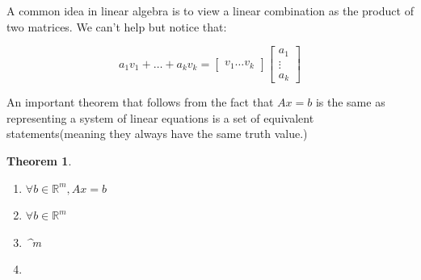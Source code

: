 \documentclass{article}
\newtheorem{thm}{Theorem}
\begin{document}
A common idea in linear algebra is to view a linear combination as the product of two matrices. We can't help but notice that:

\begin{equation*}
    a_{1}v_{1} + \ldots + a_{k}v_{k} = \begin{bmatrix}
        v_{1}  \ldots v_{k}
    \end{bmatrix} \begin{bmatrix}
        a_{1} \\
        \vdots \\
        a_{k}
    \end{bmatrix}
\end{equation*}

An important theorem that follows from the fact that $Ax=b$ is the same as representing a system of linear equations is a set of equivalent statements(meaning they always have the same truth value.) 

\begin{thm}
\begin{enumerate}
    \item $\forall b \in \mathbb{R}^{m}, Ax=b$ 
    \item $ \forall b \in \mathbb{R}^{m}$ 
    \item {} ^{m}
    \item {}
\end{enumerate}
\end{thm}
\end{document}

